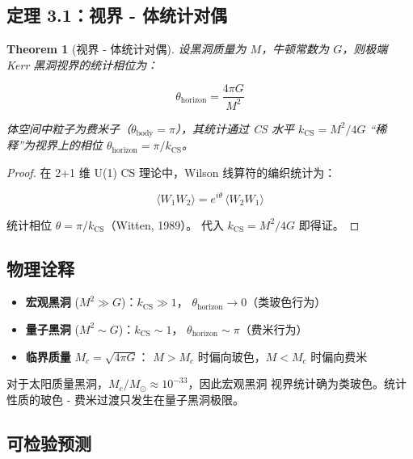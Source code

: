 \documentclass[11pt,a4paper]{article}
\newtheorem{theorem}{Theorem}[section]
\begin{document}
\subsection{定理 3.1：视界 - 体统计对偶}

\begin{theorem}[视界 - 体统计对偶]
设黑洞质量为 $M$，牛顿常数为 $G$，则极端 Kerr 黑洞视界的统计相位为：

\begin{equation}
\boxed{\theta_{\text{horizon}} = \frac{4\pi G}{M^2}}
\end{equation}

体空间中粒子为费米子（$\theta_{\text{body}} = \pi$），其统计通过
CS 水平 $k_{\text{CS}} = M^2/4G$ ``稀释''为视界上的相位
$\theta_{\text{horizon}} = \pi/k_{\text{CS}}$。
\end{theorem}

\begin{proof}
在 2+1 维 U(1) CS 理论中，Wilson 线算符的编织统计为：

\begin{equation}
\langle W_1 W_2 \rangle = e^{i\theta}\,\langle W_2 W_1 \rangle
\end{equation}

统计相位 $\theta = \pi/k_{\text{CS}}$（Witten, 1989）。
代入 $k_{\text{CS}} = M^2/4G$ 即得证。
\end{proof}

\subsection{物理诠释}

\begin{itemize}
\item \textbf{宏观黑洞} ($M^2 \gg G$)：$k_{\text{CS}} \gg 1$，
$\theta_{\text{horizon}} \to 0$（类玻色行为）
\item \textbf{量子黑洞} ($M^2 \sim G$)：$k_{\text{CS}} \sim 1$，
$\theta_{\text{horizon}} \sim \pi$（费米行为）
\item \textbf{临界质量} $M_c = \sqrt{4\pi G}$：
$M > M_c$ 时偏向玻色，$M < M_c$ 时偏向费米
\end{itemize}

对于太阳质量黑洞，$M_c/M_\odot \approx 10^{-33}$，因此宏观黑洞
视界统计确为类玻色。统计性质的玻色 - 费米过渡只发生在量子黑洞极限。

\subsection{可检验预测}
\end{document}
